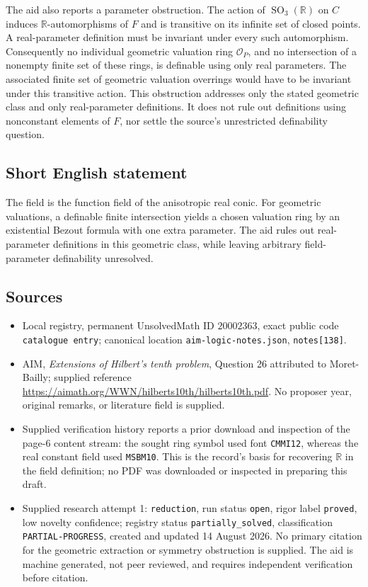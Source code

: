 \documentclass[11pt]{article}
\newcommand{\R}{\mathbb{R}}
\begin{document}
The aid also reports a parameter obstruction. The action of \(\operatorname{SO}_3(\R)\) on \(C\) induces \(\R\)-automorphisms of \(F\) and is transitive on its infinite set of closed points. A real-parameter definition must be invariant under every such automorphism. Consequently no individual geometric valuation ring \(\mathcal O_P\), and no intersection of a nonempty finite set of these rings, is definable using only real parameters. The associated finite set of geometric valuation overrings would have to be invariant under this transitive action. This obstruction addresses only the stated geometric class and only real-parameter definitions. It does not rule out definitions using nonconstant elements of \(F\), nor settle the source's unrestricted definability question.
\subsection{Short English statement}
The field is the function field of the anisotropic real conic. For geometric valuations, a definable finite intersection yields a chosen valuation ring by an existential Bezout formula with one extra parameter. The aid rules out real-parameter definitions in this geometric class, while leaving arbitrary field-parameter definability unresolved.
\subsection{Sources}
\begin{itemize}
\item Local registry, permanent UnsolvedMath ID \(20002363\), exact public code \texttt{catalogue entry}; canonical location \texttt{aim-logic-notes.json}, \texttt{notes[138]}.
\item AIM, \emph{Extensions of Hilbert's tenth problem}, Question 26 attributed to Moret-Bailly; supplied reference \url{https://aimath.org/WWN/hilberts10th/hilberts10th.pdf}. No proposer year, original remarks, or literature field is supplied.
\item Supplied verification history reports a prior download and inspection of the page-6 content stream: the sought ring symbol used font \texttt{CMMI12}, whereas the real constant field used \texttt{MSBM10}. This is the record's basis for recovering \(\R\) in the field definition; no PDF was downloaded or inspected in preparing this draft.
\item Supplied research attempt 1: \texttt{reduction}, run status \texttt{open}, rigor label \texttt{proved}, low novelty confidence; registry status \texttt{partially\_solved}, classification \texttt{PARTIAL-PROGRESS}, created and updated 14 August 2026. No primary citation for the geometric extraction or symmetry obstruction is supplied. The aid is machine generated, not peer reviewed, and requires independent verification before citation.
\end{itemize}
\end{document}
